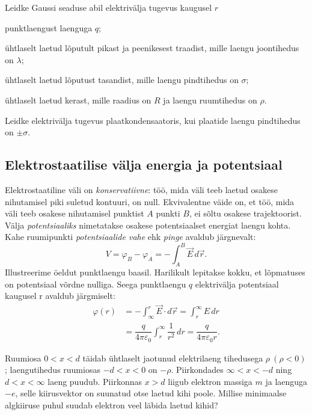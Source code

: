\documentclass[a4paper,11pt,twocolumn]{article}
\begin{document}
\begin{question}
	Leidke Gaussi seaduse abil elektrivälja tugevus kaugusel $r$
	\begin{subquestion}
		\item punktlaengust laenguga \( q \);
		\item ühtlaselt laetud lõputult pikast ja peenikesest traadist, mille laengu joontihedus on $\lambda$;
		\item ühtlaselt laetud lõputust tasandist, mille laengu pindtihedus on $\sigma$;
		\item ühtlaselt laetud kerast, mille raadius on $R$ ja laengu ruumtihedus on $\rho$.
	\end{subquestion}
\end{question}

\begin{question}
	Leidke elektrivälja tugevus plaatkondensaatoris, kui plaatide laengu pindtihedus on $\pm\sigma$.
\end{question}

\subsection{Elektrostaatilise välja energia ja potentsiaal}
Elektrostaatiline väli on \textit{konservatiivne}: töö, mida väli teeb laetud osakese nihutamisel piki suletud kontuuri, on null. Ekvivalentne väide on, et töö, mida väli teeb osakese nihutamisel punktist \( A \) punkti \( B \), ei sõltu osakese trajektoorist. Välja \textit{potentsiaaliks} nimetatakse osakese potentsiaalset energiat laengu kohta. Kahe ruumipunkti \textit{potentsiaalide vahe} ehk \textit{pinge} avaldub järgnevalt:
\[ V=\varphi_B-\varphi_A=-\int_{A}^{B} \vec{E}\, d\vec{r}.\]
Illustreerime öeldut punktlaengu baasil. Harilikult lepitakse kokku, et lõpmatuses on potentsiaal võrdne nulliga. Seega punktlaengu \( q \) elektrivälja potentsiaal kaugusel r avaldub järgmiselt:
\begin{align*}
\varphi(r)&=-\int_{\infty}^{r}\vec{E}\cdot d\vec{r}=\int_{r}^{\infty}{E}\, dr\\
		  &=\dfrac{q}{4\pi\varepsilon_0}\int_{r}^{\infty}\dfrac{1}{r^2}\, dr=\dfrac{q}{4\pi\varepsilon_0 r}.
\end{align*}

\begin{question}
	Ruumiosa \( 0 < x < d \) täidab ühtlaselt jaotunud elektrilaeng tihedusega \( \rho \ (\rho<0)\); laengutihedus ruumiosas \( −d < x < 0 \) on \( -\rho \). Piirkondades \( \infty < x < −d \) ning \( d < x < \infty \) laeng puudub. Piirkonnas \( x > d \) liigub elektron massiga \( m \) ja laenguga \( −e \), selle kiirusvektor on suunatud otse laetud kihi poole. Millise minimaalse algkiiruse puhul suudab elektron veel läbida laetud kihid?
\end{question}
\end{document}
